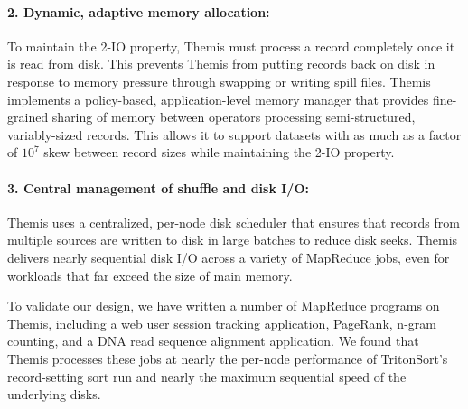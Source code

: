 \paragraph{2. Dynamic, adaptive memory allocation:} To maintain the 2-IO
property, Themis must process a record completely once it is read from disk.
This prevents Themis from putting records back on disk in response to memory
pressure through swapping or writing spill files.  Themis implements a
policy-based, application-level memory manager that provides fine-grained
sharing of memory between operators processing semi-structured, variably-sized
records.  This allows it to support datasets with as much as a factor of
$10^7$ skew between record sizes while maintaining the 2-IO property.

\paragraph{3. Central management of shuffle and disk I/O:} Themis uses a
centralized, per-node disk scheduler that ensures that records from multiple
sources are written to disk in large batches to reduce disk seeks.  Themis
delivers nearly sequential disk I/O across a variety of MapReduce jobs, even
for workloads that far exceed the size of main memory.

To validate our design, we have written a number of MapReduce programs on
Themis, including a web user session tracking application, PageRank, n-gram
counting, and a DNA read sequence alignment application.  We found that Themis
processes these jobs at nearly the per-node performance of TritonSort's
record-setting sort run and nearly the maximum sequential speed of the
underlying disks.

